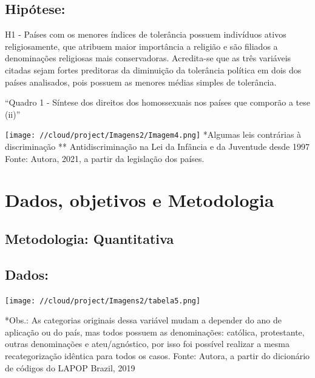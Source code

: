 \documentclass[
]{article}
\begin{document}
\hypertarget{hipuxf3tese}{%
\subsection{Hipótese:}\label{hipuxf3tese}}

H1 - Países com os menores índices de tolerância possuem indivíduos
ativos religiosamente, que atribuem maior importância a religião e são
filiados a denominações religiosas mais conservadoras. Acredita-se que
as três variáveis citadas sejam fortes preditoras da diminuição da
tolerância política em dois dos países analisados, pois possuem as
menores médias simples de tolerância.

``Quadro 1 - Síntese dos direitos dos homossexuais nos países que
comporão a tese (ii)''

\texttt{[image: //cloud/project/Imagens2/Imagem4.png]} *Algumas leis
contrárias à discriminação ** Antidiscriminação na Lei da Infância e da
Juventude desde 1997 Fonte: Autora, 2021, a partir da legislação dos
países.

\vspace{5truemm}

\hypertarget{dados-objetivos-e-metodologia}{%
\section{Dados, objetivos e
Metodologia}\label{dados-objetivos-e-metodologia}}

\hypertarget{metodologia-quantitativa}{%
\subsection{Metodologia: Quantitativa}\label{metodologia-quantitativa}}

\hypertarget{dados}{%
\subsection{Dados:}\label{dados}}

\texttt{[image: //cloud/project/Imagens2/tabela5.png]}

*Obs.: As categorias originais dessa variável mudam a depender do ano de
aplicação ou do país, mas todos possuem as denominações: católica,
protestante, outras denominações e ateu/agnóstico, por isso foi possível
realizar a mesma recategorização idêntica para todos os casos. Fonte:
Autora, a partir do dicionário de códigos do LAPOP Brazil, 2019

\vspace{5truemm}
\end{document}
